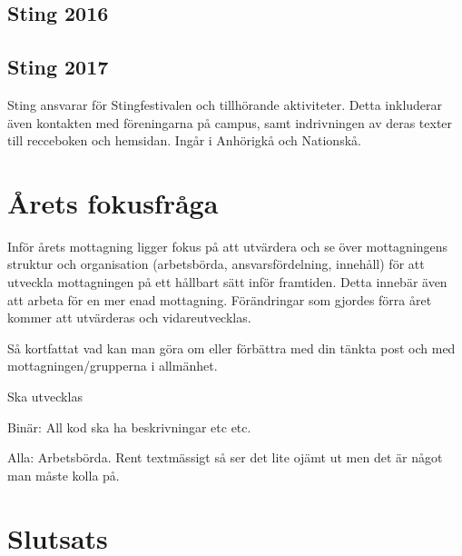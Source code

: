\documentclass[a4paper]{article}
\begin{document}
\subsection{Sting 2016}



\subsection{Sting 2017}

Sting ansvarar för Stingfestivalen och tillhörande 
aktiviteter. Detta inkluderar även kontakten med 
föreningarna på campus, samt indrivningen av deras 
texter till recceboken och hemsidan. Ingår i Anhörigkå 
och Nationskå.

\section{Årets fokusfråga}

Inför årets mottagning ligger fokus på att utvärdera 
och se över mottagningens struktur och organisation 
(arbetsbörda, ansvarsfördelning, innehåll) för att 
utveckla mottagningen på ett hållbart sätt inför 
framtiden. Detta innebär även att arbeta för en mer 
enad mottagning. Förändringar som gjordes förra året 
kommer att utvärderas och vidareutvecklas.

Så kortfattat vad kan man göra om eller förbättra med 
din tänkta post och med mottagningen/grupperna i 
allmänhet.

Ska utvecklas

Binär: All kod ska ha beskrivningar etc etc.

Alla: Arbetsbörda. Rent textmässigt så ser det lite 
ojämt ut men det är något man måste kolla på. 


\section{Slutsats}
\end{document}
